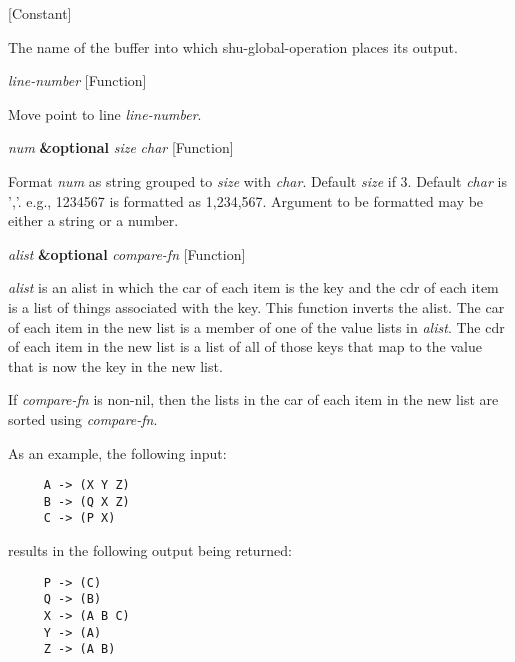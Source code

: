 \vspace{1em}
\noindent
{}
\usebox{\funcname}
 \hfill [Constant]

\begin{doc-string}
The name of the buffer into which shu-global-operation places its output.
\end{doc-string}

\vspace{1em}
\noindent
{}
\usebox{\funcname}\emph{line-number}
 \hfill [Function]

\begin{doc-string}
Move point to line \emph{line-number}.
\end{doc-string}

\vspace{1em}
\noindent
{}
\usebox{\funcname}\emph{num} \textbf{\&optional} \emph{size} \emph{char}
 \hfill [Function]

\begin{doc-string}
Format \emph{num} as string grouped to \emph{size} with \emph{char}.  Default \emph{size} if 3.  Default \emph{char}
is ','.  e.g., 1234567 is formatted as 1,234,567.  Argument to be formatted may be
either a string or a number.
\end{doc-string}

\vspace{1em}
\noindent
{}
\usebox{\funcname}\emph{alist} \textbf{\&optional} \emph{compare-fn}
 \hfill [Function]

\begin{doc-string}
\emph{alist} is an alist in which the car of each item is the key and the cdr of
each item is a list of things associated with the key.  This function inverts
the alist.  The car of each item in the new list is a member of one of the value
lists in \emph{alist}.  The cdr of each item in the new list is a list of all of those
keys that map to the value that is now the key in the new list.

If \emph{compare-fn} is non-nil, then the lists in the car of each item in the new list
are sorted using \emph{compare-fn}.

As an example, the following input:

\small{\begin{verbatim}
     A -> (X Y Z)
     B -> (Q X Z)
     C -> (P X)
\end{verbatim}}

results in the following output being returned:

\small{\begin{verbatim}
     P -> (C)
     Q -> (B)
     X -> (A B C)
     Y -> (A)
     Z -> (A B)
\end{verbatim}}
\end{doc-string}

